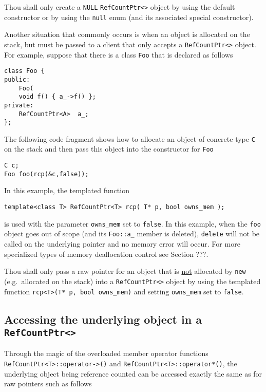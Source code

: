 \begin{commandment}
Thou shall only create a \texttt{NULL}
\texttt{RefCountPtr<>} object by using the default constructor
or by using the \texttt{null} enum (and its associated special
constructor).
\end{commandment}

Another situation that commonly occurs is when an object is allocated
on the stack, but must be passed to a client that only accepts a
\texttt{RefCountPtr<>} object.  For example, suppose that there is a
class \texttt{Foo} that is declared as follows
%
{\scriptsize\begin{verbatim}
class Foo {
public:
    Foo(
    void f() { a_->f() };
private:
    RefCountPtr<A>  a_;
};
\end{verbatim}}
%
The following code fragment shows how to allocate an object of concrete
type \texttt{C} on the stack and then pass this object into the constructor
for \texttt{Foo}
%
{\scriptsize\begin{verbatim}
C c;
Foo foo(rcp(&c,false));
\end{verbatim}}
%
In this example, the templated function
%
{\scriptsize\begin{verbatim}
template<class T> RefCountPtr<T> rcp( T* p, bool owns_mem );
\end{verbatim}}
%
\noindent{}is used with the parameter \texttt{owns\_mem} set to
\texttt{false}.  In this example, when the \texttt{foo} object
goes out of scope (and its \texttt{Foo::a\_} member is deleted),
\texttt{delete} will not be called on the underlying pointer and no
memory error will occur.  For more specialized types of memory
deallocation control see Section ???.

\begin{commandment}
Thou shall only pass a raw pointer for an object that is
\underline{not} allocated by \texttt{new} (e.g.~allocated on the stack) into a
\texttt{RefCountPtr<>} object by using the templated function
\texttt{rcp<T>(T* p, bool owns\_mem)} and setting \texttt{owns\_mem} set
to \texttt{false}.
\end{commandment}

%
\subsection{Accessing the underlying object in a \texttt{RefCountPtr<>}}
%

Through the magic of the overloaded member operator functions
\texttt{RefCountPtr<T>::operator->()} and
\texttt{RefCountPtr<T>::operator*()}, the underlying object being reference
counted can be accessed exactly the same as for raw pointers such as
follows


